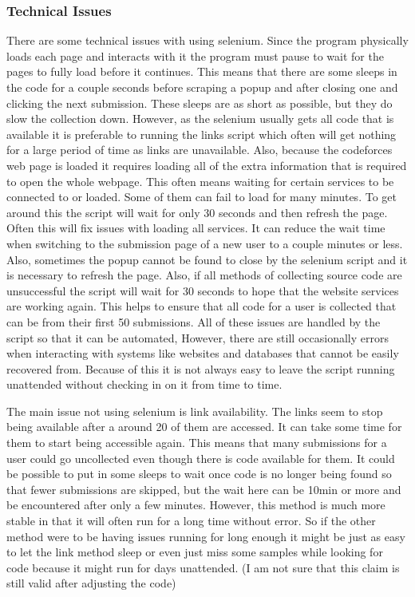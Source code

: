\documentclass{article}
\begin{document}
\subsubsection*{Technical Issues}
There are some technical issues with using selenium. Since the program physically loads each page and interacts with it the program must pause to wait for the pages to fully load before it continues. This means that there are some sleeps in the code for a couple seconds before scraping a popup and after closing one and clicking the next submission. These sleeps are as short as possible, but they do slow the collection down. However, as the selenium usually gets all code that is available it is preferable to running the links script which often will get nothing for a large period of time as links are unavailable. Also, because the codeforces web page is loaded it requires loading all of the extra information that is required to open the whole webpage. This often means waiting for certain services to be connected to or loaded. Some of them can fail to load for many minutes. To get around this the script will wait for only 30 seconds and then refresh the page. Often this will fix issues with loading all services. It can reduce the wait time when switching to the submission page of a new user to a couple minutes or less. Also, sometimes the popup cannot be found to close by the selenium script and it is necessary to refresh the page. Also, if all methods of collecting source code are unsuccessful the script will wait for 30 seconds to hope that the website services are working again. This helps to ensure that all code for a user is collected that can be from their first 50 submissions. All of these issues are handled by the script so that it can be automated, However, there are still occasionally errors when interacting with systems like websites and databases that cannot be easily recovered from. Because of this it is not always easy to leave the script running unattended without checking in on it from time to time.

The main issue not using selenium is link availability. The links seem to stop being available after a around 20 of them are accessed. It can take some time for them to start being accessible again. This means that many submissions for a user could go uncollected even though there is code available for them. It could be possible to put in some sleeps to wait once code is no longer being found so that fewer submissions are skipped, but the wait here can be 10min or more and be encountered after only a few minutes. However, this method is much more stable in that it will often run for a long time without error. So if the other method were to be having issues running for long enough it might be just as easy to let the link method sleep or even just miss some samples while looking for code because it might run for days unattended. (I am not sure that this claim is still valid after adjusting the code)
\end{document}
